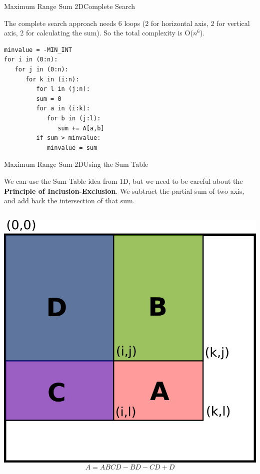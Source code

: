 \begin{frame}[fragile]{Maximum Range Sum 2D}{Complete Search}

\begin{block}{}
  The complete search approach needs 6 loops (2 for horizontal axis, 2 for vertical axis, 2 for calculating the sum). So the total complexity is O($n^6$).
\end{block}

\begin{block}{}
{\smaller
\begin{verbatim}
minvalue = -MIN_INT
for i in (0:n):
   for j in (0:n):
      for k in (i:n):
         for l in (j:n):
         sum = 0
         for a in (i:k):
            for b in (j:l):
               sum += A[a,b]
         if sum > minvalue:
            minvalue = sum
\end{verbatim}
}
\end{block}
\end{frame}

\begin{frame}[fragile]{Maximum Range Sum 2D}{Using the Sum Table}

We can use the Sum Table idea from 1D, but we need to be careful about the {\bf Principle of Inclusion-Exclusion}. We subtract the partial sum of two axis, and add back the intersection of that sum.
\bigskip

\begin{columns}
  \includegraphics[width=\textwidth]{img/inclusion_exclusion}
  \[A = ABCD - BD - CD + D\]
\end{columns}

\end{frame}

